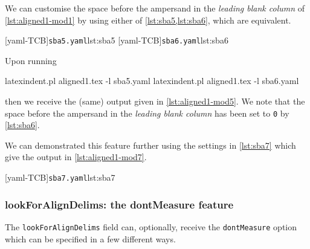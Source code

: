  \begin{example}
 We can customise the space before the ampersand in the \emph{leading blank column} of
 \cref{lst:aligned1-mod1} by using either of \cref{lst:sba5,lst:sba6}, which are
 equivalent.

 \begin{cmhtcbraster}
  [yaml-TCB]{\texttt{sba5.yaml}}{lst:sba5}
  [yaml-TCB]{\texttt{sba6.yaml}}{lst:sba6}
 \end{cmhtcbraster}

 Upon running

 \begin{commandshell}
latexindent.pl aligned1.tex -l sba5.yaml
latexindent.pl aligned1.tex -l sba6.yaml
\end{commandshell}

 then we receive the (same) output given in \cref{lst:aligned1-mod5}. We note that the
 space before the ampersand in the \emph{leading blank column} has been set to \texttt{0}
 by \cref{lst:sba6}.

 We can demonstrated this feature further using the settings in \cref{lst:sba7} which
 give the output in \cref{lst:aligned1-mod7}.

 \begin{cmhtcbraster}[raster columns=3,
   raster left skip=-3.75cm,
   raster right skip=-2cm,]
  [yaml-TCB]{\texttt{sba7.yaml}}{lst:sba7}
 \end{cmhtcbraster}
 \end{example}

\subsubsection{lookForAlignDelims: the dontMeasure feature}\label{sec:dontMeasure}
 The  \texttt{lookForAlignDelims} field can,
 optionally, receive the \texttt{dontMeasure} option which can be specified in a few
 different ways.

